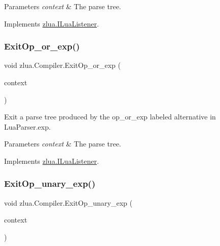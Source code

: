 \begin{DoxyParams}{Parameters}
{\em context} & The parse tree.\\
\hline
\end{DoxyParams}


Implements \mbox{\hyperlink{interfacezlua_1_1_i_lua_listener_a25a0b962824e954f08d1dc84e4e4d13d}{zlua.\+I\+Lua\+Listener}}.

\mbox{\label{classzlua_1_1_compiler_a64367a7cac1636be85228c39a80b0ae7}} 
\subsubsection{\texorpdfstring{Exit\+Op\+\_\+or\+\_\+exp()}{ExitOp\_or\_exp()}}
{\footnotesize\ttfamily void zlua.\+Compiler.\+Exit\+Op\+\_\+or\+\_\+exp (\begin{DoxyParamCaption}\item[{\mbox{[}\+Not\+Null\mbox{]} \mbox{\hyperlink{classzlua_1_1_lua_parser_1_1_op__or__exp_context}{Lua\+Parser.\+Op\+\_\+or\+\_\+exp\+Context}}}]{context }\end{DoxyParamCaption})}



Exit a parse tree produced by the {\ttfamily op\+\_\+or\+\_\+exp} labeled alternative in Lua\+Parser.\+exp. 


\begin{DoxyParams}{Parameters}
{\em context} & The parse tree.\\
\hline
\end{DoxyParams}


Implements \mbox{\hyperlink{interfacezlua_1_1_i_lua_listener_acd1c99a866862f8c938fd314f3859852}{zlua.\+I\+Lua\+Listener}}.

\mbox{\label{classzlua_1_1_compiler_a7a151e5694262777eecc12f51f1eb1a5}} 
\subsubsection{\texorpdfstring{Exit\+Op\+\_\+unary\+\_\+exp()}{ExitOp\_unary\_exp()}}
{\footnotesize\ttfamily void zlua.\+Compiler.\+Exit\+Op\+\_\+unary\+\_\+exp (\begin{DoxyParamCaption}\item[{\mbox{[}\+Not\+Null\mbox{]} \mbox{\hyperlink{classzlua_1_1_lua_parser_1_1_op__unary__exp_context}{Lua\+Parser.\+Op\+\_\+unary\+\_\+exp\+Context}}}]{context }\end{DoxyParamCaption})}



